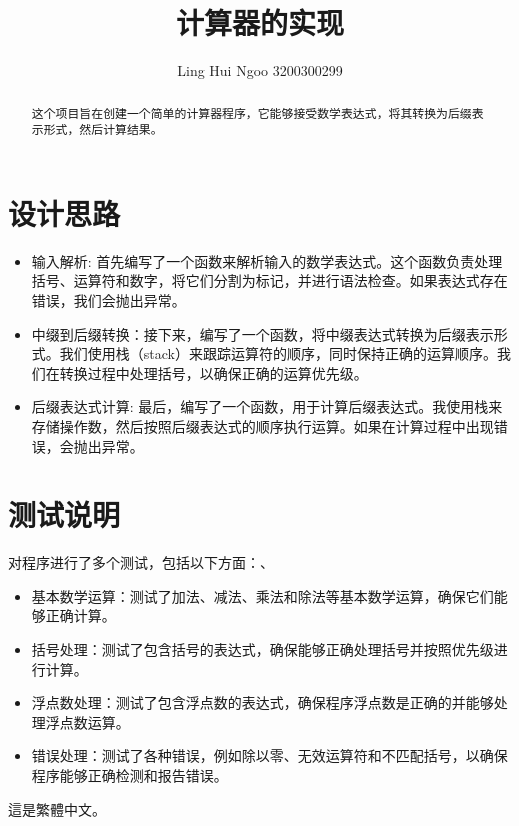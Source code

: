 \documentclass{ctexart}
\begin{document}
\title{计算器的实现}
\author{Ling Hui Ngoo 3200300299}
\maketitle

\begin{abstract}
这个项目旨在创建一个简单的计算器程序，它能够接受数学表达式，将其转换为后缀表示形式，然后计算结果。
\end{abstract}

\section{设计思路}
\begin{itemize}
    \item 输入解析: 首先编写了一个函数来解析输入的数学表达式。这个函数负责处理括号、运算符和数字，将它们分割为标记，并进行语法检查。如果表达式存在错误，我们会抛出异常。
    \item 中缀到后缀转换：接下来，编写了一个函数，将中缀表达式转换为后缀表示形式。我们使用栈（stack）来跟踪运算符的顺序，同时保持正确的运算顺序。我们在转换过程中处理括号，以确保正确的运算优先级。
    \item 后缀表达式计算: 最后，编写了一个函数，用于计算后缀表达式。我使用栈来存储操作数，然后按照后缀表达式的顺序执行运算。如果在计算过程中出现错误，会抛出异常。
\end{itemize}


\section{测试说明}
对程序进行了多个测试，包括以下方面：、

\begin{itemize}
    \item 基本数学运算：测试了加法、减法、乘法和除法等基本数学运算，确保它们能够正确计算。
    \item 括号处理：测试了包含括号的表达式，确保能够正确处理括号并按照优先级进行计算。
    \item 浮点数处理：测试了包含浮点数的表达式，确保程序浮点数是正确的并能够处理浮点数运算。
    \item 错误处理：测试了各种错误，例如除以零、无效运算符和不匹配括号，以确保程序能够正确检测和报告错误。
\end{itemize}

這是繁體中文。
\end{document}
